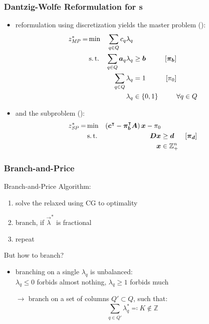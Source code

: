 \documentclass[compress,beamer,aspectratio=169,english,usenames,dvipsnames]{beamer}
\begin{document}
\begin{frame}
\frametitle{Dantzig-Wolfe Reformulation for \IP{}s}

\begin{itemize}
\item	reformulation using discretization yields the master problem (\MP{}):
		\begin{equation*}
		\begin{aligned}
		z^*_{\textit{MP}}{} = &\min & \sum_{q \in Q} c_q \lambda_q & & & \\
		&\operatorname{s.t.} & \sum_{q \in Q} {\bm{a}}_q \lambda_q & \geq {\bm{b}} & \left[{\bm{\pi}}_{\bm{b}}\right] \\
		&& \sum_{q \in Q} \lambda_q & = 1 & \left[\pi_0 \right] & \\
		&& \lambda_q & \in \{0, 1\} & & \forall q \in Q
		\end{aligned}
		\end{equation*}
\item	and the subproblem (\SP{}):
		\begin{equation*}
		\begin{aligned}
		z^*_\SP{} = &\min & \left( \mat{c}\transpose - \mat{\pi}_\mat{b}\transpose \mat{A} \right) \mat{x} - \pi_0 & & \\
		&\st & \mat{D} \mat{x} & \geq \mat{d} & \left[\mat{\pi}_\mat{d}\right] \\
		&& \mat{x} & \in \mathbb{Z}_+^n
		\end{aligned}
		\end{equation*}
\end{itemize}
\end{frame}

\begin{frame}
\frametitle{Branch-and-Price}
Branch-and-Price Algorithm:
\begin{enumerate}
\item solve the relaxed \MP{} using CG to optimality
\item branch, if $\vec{\lambda}^*$ is fractional
\item repeat
\end{enumerate}

\vspace{1em}

\pause
But how to branch?
\begin{itemize}
\item	branching on a single $\lambda_q$ is unbalanced:\\$\lambda_q \leq 0$ forbids almost nothing, $\lambda_q \geq 1$ forbids much
\pause
\item[$\rightarrow$]	branch on a set of columns $Q' \subset Q$, such that:
		\begin{equation*}
		\sum_{q \in Q'} \lambda_q^* \eqqcolon K \not\in \mathbb{Z}
		\end{equation*}
\end{itemize}
\end{frame}
\end{document}

